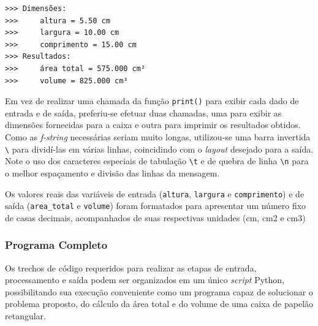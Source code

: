 \documentclass[
]{book}
\begin{document}
\begin{verbatim}
>>> Dimensões:
>>>     altura = 5.50 cm
>>>     largura = 10.00 cm
>>>     comprimento = 15.00 cm
>>> Resultados:
>>>     área total = 575.000 cm²
>>>     volume = 825.000 cm³
\end{verbatim}

Em vez de realizar uma chamada da função \texttt{print()} para exibir cada dado de entrada e de saída, preferiu-se efetuar duas chamadas, uma para exibir as dimensões fornecidas para a caixa e outra para imprimir os resultados obtidos. Como as \emph{f-string} necessárias seriam muito longas, utilizou-se uma barra invertida \texttt{\textbackslash{}} para dividí-las em várias linhas, coincidindo com o \emph{layout} desejado para a saída. Note o uso dos caracteres especiais de tabulação \texttt{\textbackslash{}t} e de quebra de linha \texttt{\textbackslash{}n} para o melhor espaçamento e divisão das linhas da mensagem.

Os valores reais das variáveis de entrada (\texttt{altura}, \texttt{largura} e \texttt{comprimento}) e de saída (\texttt{area\_total} e \texttt{volume}) foram formatados para apresentar um número fixo de casas decimais, acompanhados de suas respectivas unidades (cm, cm2 e cm3)

\hypertarget{programa-completo-1}{%
\subsubsection{Programa Completo}\label{programa-completo-1}}

Os trechos de código requeridos para realizar as etapas de entrada, processamento e saída podem ser organizados em um único \emph{script} Python, possibilitando sua execução conveniente como um programa capaz de solucionar o problema proposto, do cálculo da área total e do volume de uma caixa de papelão retangular.
\end{document}
